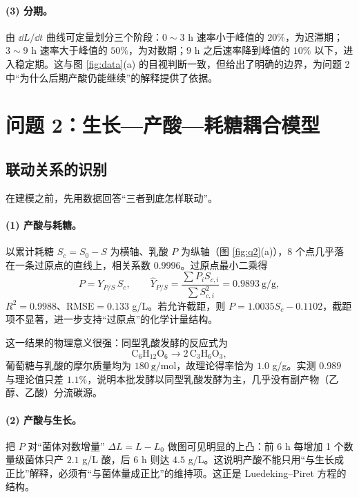 \paragraph{(3) 分期。}由 $\dd L/\dd t$ 曲线可定量划分三个阶段：$0\sim3$ h 速率小于峰值的 $20\%$，为迟滞期；$3\sim9$ h 速率大于峰值的 $50\%$，为对数期；$9$ h 之后速率降到峰值的 $10\%$ 以下，进入稳定期。这与图 \ref{fig:data}(a) 的目视判断一致，但给出了明确的边界，为问题 2 中“为什么后期产酸仍能继续”的解释提供了依据。

\section{问题 2：生长—产酸—耗糖耦合模型}

\subsection{联动关系的识别}
在建模之前，先用数据回答“三者到底怎样联动”。

\paragraph{(1) 产酸与耗糖。}以累计耗糖 $S_c=S_0-S$ 为横轴、乳酸 $P$ 为纵轴（图 \ref{fig:q2}(a)），8 个点几乎落在一条过原点的直线上，相关系数 $0.9996$。过原点最小二乘得
\begin{equation}
P=Y_{P/S}\,S_c,\qquad \hat Y_{P/S}=\frac{\sum P_iS_{c,i}}{\sum S_{c,i}^2}=0.9893\ \mathrm{g/g},
\label{eq:yield}
\end{equation}
$R^2=0.9988$、$\mathrm{RMSE}=0.133$ g/L。若允许截距，则 $P=1.0035S_c-0.1102$，截距项不显著，进一步支持“过原点”的化学计量结构。

这一结果的物理意义很强：同型乳酸发酵的反应式为
$$\mathrm{C_6H_{12}O_6\longrightarrow 2\,C_3H_6O_3},$$
葡萄糖与乳酸的摩尔质量均为 $180\ \mathrm{g/mol}$，故理论得率恰为 $1.0$ g/g。实测 $0.989$ 与理论值只差 $1.1\%$，说明本批发酵以同型乳酸发酵为主，几乎没有副产物（乙醇、乙酸）分流碳源。

\paragraph{(2) 产酸与生长。}把 $P$ 对“菌体对数增量” $\Delta L=L-L_0$ 做图可见明显的上凸：前 6 h 每增加 1 个数量级菌体只产 $2.1$ g/L 酸，后 6 h 则达 $4.5$ g/L。这说明产酸不能只用“与生长成正比”解释，必须有“与菌体量成正比”的维持项。这正是 Luedeking--Piret 方程的结构。


